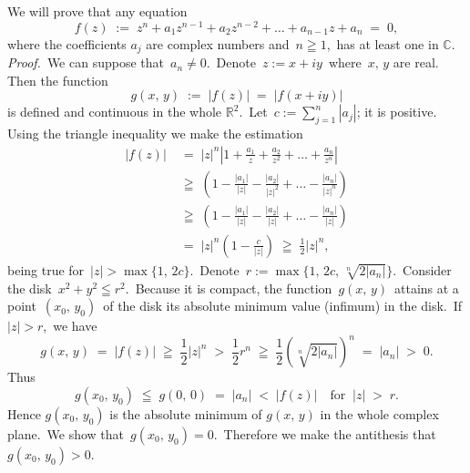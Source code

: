 \documentclass[12pt]{article}
\theoremstyle{definition}
\begin{document}
We will prove that any equation
$$f(z) \;:=\; z^n\!+\!a_1z^{n-1}\!+\!a_2z^{n-2}\!+\ldots+\!a_{n-1}z\!+\!a_n \;=\; 0,$$
where the coefficients $a_j$ are complex numbers and\, $n \geqq 1$,\, has at least one  in 
$\mathbb{C}$.\\

\emph{Proof.}\, We can suppose that\, $a_n \neq 0$.\, Denote\, $z := x\!+\!iy$\, where\, $x,\,y$ are real.\, Then the function
$$g(x,\,y) \;:=\; |f(z)| \;=\; |f(x\!+\!iy)|$$
is defined and continuous in the whole $\mathbb{R}^2$.\, Let\, $c := \sum_{j=1}^n|a_j|$; it is positive.\, Using the triangle inequality we make the estimation
\begin{align*}
|f(z)| &\;=\; |z|^n\left|1+\frac{a_1}{z}+\frac{a_2}{z^2}+\ldots+\frac{a_n}{z^n}\right|\\
       &\;\geqq\; \left(1-\frac{|a_1|}{|z|}-\frac{|a_2|}{|z|^2}+\ldots-\frac{|a_n|}{|z|^n}\right)\\
       &\;\geqq\; \left(1-\frac{|a_1|}{|z|}-\frac{|a_2|}{|z|}+\ldots-\frac{|a_n|}{|z|}\right)\\
       &\;=\; |z|^n\left(1-\frac{c}{|z|}\right) \;\geqq\; \frac{1}{2}|z|^n,
\end{align*}
being true for\, $|z| > \max\{1,\,2c\}$.\,  Denote\, $r := \max\{1,\,2c,\,\sqrt[n]{2|a_n|}\}$.\, Consider the disk 
\,$x^2\!+\!y^2 \leqq r^2$.\, Because it is compact, the function\, $g(x,\,y)$\, attains at a point \,$(x_0,\,y_0)$\, of the disk its absolute minimum value (infimum) in the disk.\, If\, $|z| > r$,\, we have
$$g(x,\,y) \;=\; |f(z)| \;\geqq\; \frac{1}{2}|z|^n \;>\; \frac{1}{2}r^n 
\;\geqq\; \frac{1}{2}\left(\sqrt[n]{2|a_n|}\right)^n \;=\; |a_n| \;>\; 0.$$
Thus
$$g(x_0,\,y_0) \;\leqq\; g(0,\,0) \;=\; |a_n| \;<\; |f(z)| \quad \mbox{for}\;\; |z| \;>\; r.$$
Hence $g(x_0,\,y_0)$ is the absolute minimum of $g(x,\,y)$ in the whole complex plane.\, We show that\, 
$g(x_0,\,y_0) = 0$.\, Therefore we make the antithesis that\, $g(x_0,\,y_0) > 0$.
\end{document}
